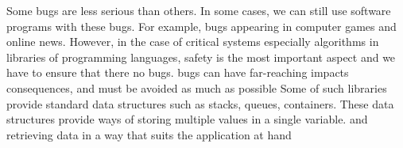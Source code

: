 %
%
%

Some bugs are less serious than others. In some cases, we can still use software programs with these bugs. For example, bugs appearing in computer games and online news.
However, in the case of critical systems 
especially algorithms  in libraries of programming languages, safety is the most important aspect and we have to ensure that there no bugs.
{bugs can have far-reaching impacts consequences, and must be avoided as much as possible}
Some of such libraries provide standard data structures such as stacks, queues, containers. These  data structures provide ways of storing multiple values in a single variable.
{and retrieving data in a way that suits the application at hand}
